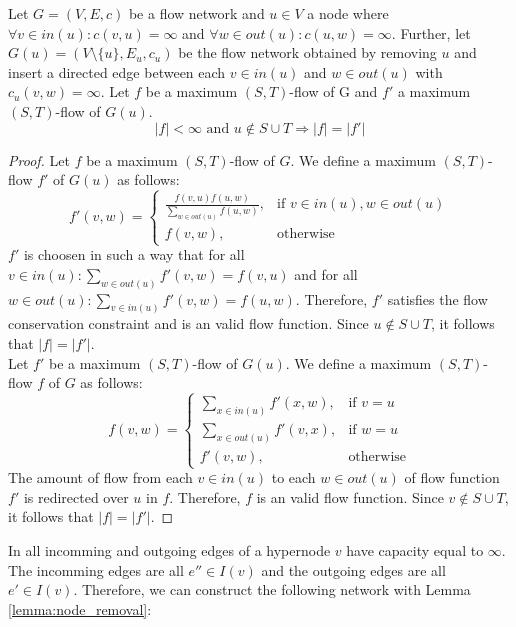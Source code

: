 \begin{lemma}
\label{lemma:node_removal}
Let $G = (V,E,c)$ be a flow network and $u \in V$ a node where
$\forall v \in in(u): c(v,u) = \infty$ and $\forall w \in out(u): c(u,w) = \infty$.
Further, let $G(u) = (V\setminus\{u\}, E_u, c_u)$ be the flow network obtained by removing
$u$ and insert a directed edge between each $v \in in(u)$ and $w \in out(u)$ with $c_u(v,w) = \infty$.
Let $f$ be a maximum $(S,T)$-flow of G and $f'$ a maximum $(S,T)$-flow of
$G(u)$.
\[|f| < \infty \text{ and } u \notin S\cup T \Rightarrow |f| = |f'|\]
\end{lemma}

\begin{proof}
Let $f$ be a maximum $(S,T)$-flow of $G$. We define a maximum $(S,T)$-flow $f'$ 
of $G(u)$ as follows:
\[ 
f'(v,w) =  
  \begin{cases}
      \frac{f(v,u)f(u,w)}{\sum_{w \in out(u)} f(u,w)}, & \text{if } v \in in(u), w \in out(u) \\
      f(v,w), & \text{otherwise}
   \end{cases} 
\]
$f'$ is choosen in such a way that for all $v \in in(u): \sum_{w \in out(u)} f'(v,w) = f(v,u)$
and for all $w \in out(u): \sum_{v \in in(u)} f'(v,w) = f(u,w)$. Therefore, $f'$
satisfies the flow conservation constraint and is an valid flow function. Since
$u \notin S\cup T$, it follows that $|f| = |f'|$. \\
Let $f'$ be a maximum $(S,T)$-flow of $G(u)$. We define a maximum $(S,T)$-flow $f$
of $G$ as follows:
\[
f(v,w) =  
  \begin{cases}
      \sum_{x \in in(u)} f'(x,w), & \text{if } v = u \\
      \sum_{x \in out(u)} f'(v,x), & \text{if } w = u \\
      f'(v,w), & \text{otherwise}
   \end{cases} 
\]
The amount of flow from each $v \in in(u)$ to each $w \in out(u)$ of flow function
$f'$ is redirected over $u$ in $f$. Therefore, $f$ is an valid flow function.
Since $v \notin S\cup T$, it follows that $|f| = |f'|$.
\end{proof}

In  all incomming and outgoing edges of a hypernode $v$ have 
capacity equal to $\infty$. The incomming edges are all $e'' \in I(v)$ and
the outgoing edges are all $e' \in I(v)$. Therefore, we can construct the
following network with Lemma \ref{lemma:node_removal}:

